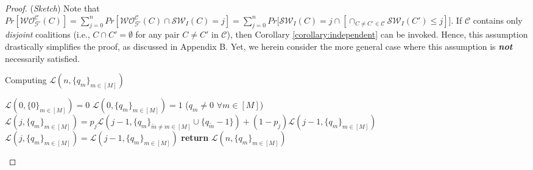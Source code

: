 \documentclass[letterpaper]{article} %
\begin{document}
\begin{proof}
(\textit{Sketch}) Note that $Pr[\mathcal{WO}^{\mathcal{C}}_{\mathcal{G}'}(C)] = \sum_{j=0}^{n} Pr[\mathcal{WO}^{\mathcal{C}}_{\mathcal{G}'}(C) \cap \mathcal{SW}_I(C) = j] = \sum_{j=0}^n Pr\big[\mathcal{SW}_I(C) = j \cap [\cap_{C \neq C' \in \mathcal{C}} \mathcal{SW}_I(C') \leq j]\big]$. If $\mathcal{C}$ contains only \textit{disjoint} coalitions (i.e., $C \cap C' = \emptyset$ for any pair $C \neq C'$ in $\mathcal{C}$), then Corollary \ref{corollary:independent} can be invoked. Hence, this assumption drastically simplifies the proof, as discussed in Appendix B. Yet, we herein consider the more general case where this assumption is \textit{\textbf{not}} necessarily satisfied. 
%

\begin{algorithm}[tb]
\caption{Computing $\mathcal{L}(n,\{q_m\}_{m \in [M]})$}
\label{alg:poly many}
\begin{algorithmic}[1] %
\STATE $\mathcal{L}(0,\{0\}_{m \in [M]}) = 0$
\STATE $\mathcal{L}(0,\{q_m\}_{m \in [M]}) = 1$ ($q_m \neq 0$ $\forall m \in [M]$)
\STATE $\mathcal{L}(j,\{q_m\}_{m \in [M]}) = p_j \mathcal{L}(j-1,\{q_m\}_{\tilde{m} \neq m \in [M]} \cup \{q_{\tilde{m}} - 1\}) + (1-p_j) \mathcal{L}(j-1,\{q_m\}_{m \in [M]})$
\ELSE 
\STATE $\mathcal{L}(j,\{q_m\}_{m \in [M]}) = \mathcal{L}(j-1,\{q_m\}_{m \in [M]})$
\ENDIF
\ENDFOR
\STATE \textbf{return} $\mathcal{L}(n,\{q_m\}_{m \in [M]})$
\end{algorithmic}
\end{algorithm}


\end{proof}
\end{document}
